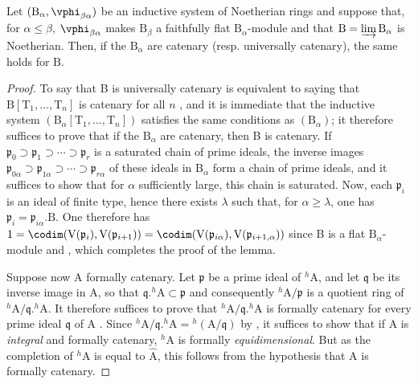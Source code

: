 \begin{lemma}[18.7.5.1]
\label{IV.18.7.5.1}
Let $(\mathrm{B}_\alpha,\vphi_{\beta\alpha})$ be an inductive system of Noetherian rings and suppose that, for $\alpha\leq\beta$, $\vphi_{\beta\alpha}$ makes $\mathrm{B}_\beta$ a faithfully flat $\mathrm{B}_\alpha$-module and that $\mathrm{B}=\varinjlim\mathrm{B}_\alpha$ is Noetherian.
Then, if the $\mathrm{B}_\alpha$ are catenary (resp. universally catenary), the same holds for $\mathrm{B}$.
\end{lemma}

\begin{proof}
To say that B is universally catenary is equivalent to saying that $\mathrm{B}[\mathrm{T}_1,\ldots,\mathrm{T}_n]$ is catenary for all $n$ , and it is immediate that the inductive system $(\mathrm{B}_\alpha[\mathrm{T}_1,\ldots,\mathrm{T}_n])$ satisfies the same conditions as $(\mathrm{B}_\alpha)$;
it therefore suffices to prove that if the $\mathrm{B}_\alpha$ are catenary, then B is catenary.
If $\mathfrak{p}_0\supset\mathfrak{p}_1\supset\cdots\supset\mathfrak{p}_r$ is a saturated chain of prime ideals, the inverse images $\mathfrak{p}_{0\alpha}\supset\mathfrak{p}_{1\alpha}\supset\cdots\supset\mathfrak{p}_{r\alpha}$ of these ideals in $\mathrm{B}_\alpha$ form a chain of prime ideals, and it suffices to show that for $\alpha$ sufficiently large, this chain is saturated.
Now, each $\mathfrak{p}_i$ is an ideal of finite type, hence there exists $\lambda$ such that, for $\alpha\geq\lambda$, one has $\mathfrak{p}_i=\mathfrak{p}_{i\alpha}.\mathrm{B}$.
One therefore has $1=\codim(\mathrm{V}(\mathfrak{p}_i),\mathrm{V}(\mathfrak{p}_{i+1}))=\codim(\mathrm{V}(\mathfrak{p}_{i\alpha}),\mathrm{V}(\mathfrak{p}_{i+1,\alpha}))$ since B is a flat $\mathrm{B}_\alpha$-module  and , which completes the proof of the lemma.

Suppose now A formally catenary.
Let $\mathfrak{p}$ be a prime ideal of ${}^h\!\mathrm{A}$, and let $\mathfrak{q}$ be its inverse image in A, so that $\mathfrak{q}.{}^h\!\mathrm{A}\subset\mathfrak{p}$ and consequently ${}^h\!\mathrm{A}/\mathfrak{p}$ is a quotient ring of ${}^h\!\mathrm{A}/\mathfrak{q}.{}^h\!\mathrm{A}$.  It therefore suffices to prove that ${}^h\!\mathrm{A}/\mathfrak{q}.{}^h\!\mathrm{A}$ is formally catenary for every prime ideal $\mathfrak{q}$ of A .  Since ${}^h\!\mathrm{A}/\mathfrak{q}.{}^h\!\mathrm{A}={}^h(\mathrm{A}/\mathfrak{q})$ by , it suffices  to show that if A is \emph{integral} and formally catenary, ${}^h\!\mathrm{A}$ is formally \emph{equidimensional}.
But as the completion of ${}^h\!\mathrm{A}$ is equal to $\hat{\mathrm{A}}$, this follows from the hypothesis that A is formally catenary.


\end{proof}
